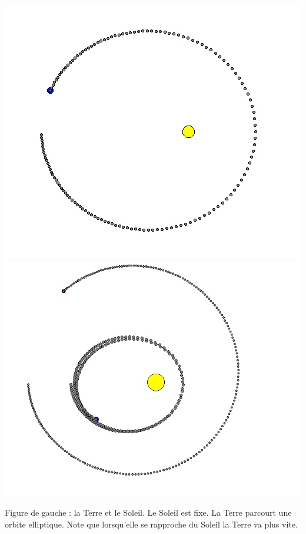 \documentclass[11pt,class=report,crop=false]{standalone}
\begin{document}
\begin{activite}


\begin{center}
\includegraphics[scale=\myscale,scale=0.4]{ecran-planetes-1}
\includegraphics[scale=\myscale,scale=0.3]{ecran-planetes-3}
\end{center}	
Figure de gauche : la Terre et le Soleil. Le Soleil est fixe. La Terre parcourt une orbite elliptique. Note que lorsqu'elle se rapproche du Soleil la Terre va plus vite.


\end{activite}
\end{document}
